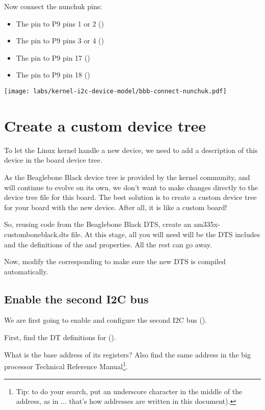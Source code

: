 Now connect the nunchuk pins:
\begin{itemize}
\item The  pin to P9 pins 1 or 2 ()
\item The  pin to P9 pins 3 or 4 ()
\item The  pin to P9 pin 17 ()
\item The  pin to P9 pin 18 ()
\end{itemize}

\begin{center}
\texttt{[image: labs/kernel-i2c-device-model/bbb-connect-nunchuk.pdf]}
\end{center}

\section{Create a custom device tree}

To let the Linux kernel handle a new device, we need to add a
description of this device in the board device tree.

As the Beaglebone Black device tree is provided by the kernel community,
and will continue to evolve on its own, we don't want to make changes
directly to the device tree file for this board. The best solution is
to create a custom device tree for your board with the new device.
After all, it is like a custom board!

So, reusing code from the Beaglebone Black DTS, create an
am335x-customboneblack.dts file. At this stage, all you will need
will be the DTS includes and the definitions of the 
and  properties. All the rest can go away.

Now, modify the corresponding  to make sure the
new DTS is compiled automatically.

\subsection{Enable the second I2C bus}

We are first going to enable and configure the second I2C bus
().

First, find the DT definitions for ().

What is the base address of its registers? Also find the same address in
the big processor Technical Reference Manual\footnote{Tip: to do your search, put an
underscore character in the middle of the address, as in
... that's how addresses are written in this document).}.

